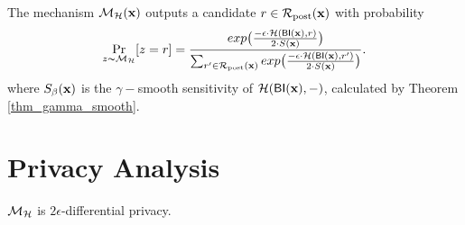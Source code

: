 \documentclass{article}
\begin{document}
\begin{definition}
\label{def_smoo}
The mechanism $\mathcal{M}_{\mathcal{H}}(\textbf{x})$ outputs a candidate $r \in \mathcal{R}_{\textup{post}}(\textbf{x})$ with probability
\begin{equation*}
\underset{z \thicksim \mathcal{M}_{\mathcal{H}}}{\Pr}[z=r] = \frac {exp\big(\frac{-\epsilon\cdot\mathcal{H}(\mathsf{BI}(\textbf{x}),r)}{2\cdot S(\textbf{x})}\big)}
{\sum_{r'\in \mathcal{R}_{\textup{post}}(\textbf{x})} exp \big(\frac{-\epsilon\cdot \mathcal{H} (\mathsf{BI}(\textbf{x}),r')}{2 \cdot S(\textbf{x})}\big)}.
\end{equation*}
where $S_\beta(\textbf{x})$ is the $\gamma -$smooth sensitivity of $\mathcal{H}(\mathsf{BI}(\textbf{x}),-)$, calculated by Theorem \ref{thm_gamma_smooth}.
\end{definition}

\section{Privacy Analysis}

\begin{lem}
\label{lem_hexpmech_privacy}
$\mathcal{M}_{\mathcal{H}}$ is $2\epsilon$-differential privacy.
\end{lem}
\end{document}
